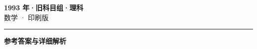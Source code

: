 \documentclass[zihao=5, a4paper]{ctexart}
\begin{document}
\begin{center}
  {\Large\bfseries 1993 年·旧科目组·理科}\\[4pt]
  {\large 数学 · 印刷版}
\end{center}
\medskip
{}

\par\bigskip\hrule\bigskip
{}
\begin{center}{\large\bfseries 参考答案与详细解析}\end{center}
\smallskip

\end{document}
